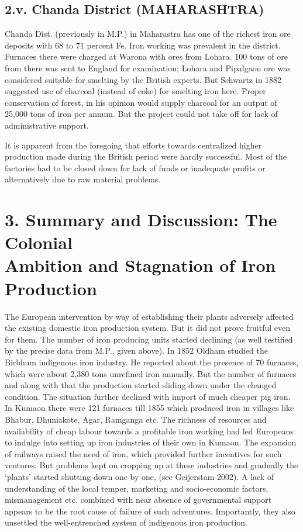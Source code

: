 \subsection*{2.v. Chanda District (MAHARASHTRA)}

Chanda Dist. (previously in M.P.) in Maharastra has one of the richest iron ore deposits with 68 to 71 percent Fe. Iron working was prevalent in the district. Furnaces there were charged at Warona with ores from Lohara.  100 tons of ore from there was sent to England for examination; Lohara and Pipalgaon ore was considered suitable for smelting by the British experts.  But Schwartz in 1882 suggested use of charcoal (instead of coke) for smelting iron here.  Proper conservation of forest, in his opinion would supply charcoal for an output of 25,000 tons of iron per annum.  But the project could not take off for lack of administrative support.

It is apparent from the foregoing that efforts towards centralized higher production made during the British period were hardly successful.  Most of the factories had to be closed down for lack of funds or inadequate profits or alternatively due to raw material problems.

\vspace{-.3cm}

\section*{3. Summary and Discussion: The Colonial\\ Ambition and Stagnation of Iron Production}\label{chapter6-section-3.a}

\vspace{-.2cm}

The European intervention by way of establishing their plants adversely affected the existing domestic iron production system. But it did not prove fruitful even for them.  The number of iron producing units started declining (as well testified by the precise data from M.P., given above).  In 1852 Oldham studied the Birbhum indigenous iron industry. He reported about the presence of 70 furnaces, which were about 2,380 tons unrefined iron annually.  But the number of furnaces and along with that the production started sliding down under the changed condition. The situation further declined with import of much cheaper pig iron. In Kumaon there were 121 furnaces till 1855 which produced iron in villages like Bhabur, Dhuniakote, Agar, Ramganga etc. The richness of resources and availability of cheap labour towards a profitable iron working had led Europeans to indulge into setting up iron industries of their own in Kumaon. The expansion of railways raised the need of iron, which provided further incentives for such ventures. But problems kept on cropping up at these industries and gradually the `plants' started shutting down one by one, (see Geijerstam 2002). A lack of understanding of the local temper, marketing and socio-economic factors, mismanagement etc. combined with near absence of governmental support appears to be the root cause of failure of such adventures. Importantly, they also unsettled the well-entrenched system of indigenous iron production. 

